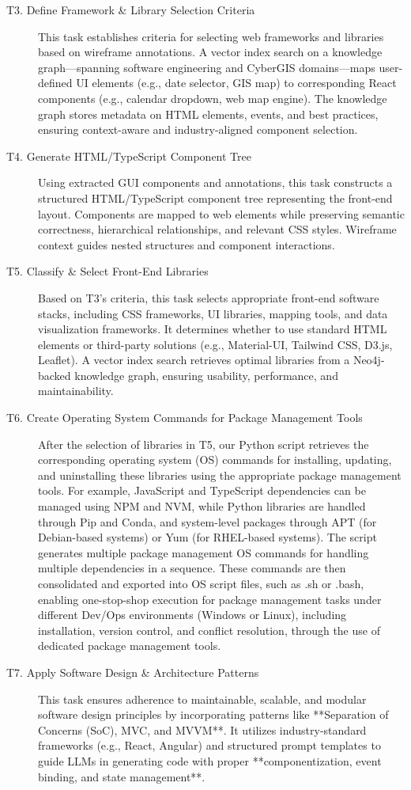 \begin{description}
\begin{description}
    \item[T3. Define Framework \& Library Selection Criteria]  
    This task establishes criteria for selecting web frameworks and libraries based on wireframe annotations. A vector index search on a knowledge graph—spanning software engineering and CyberGIS domains—maps user-defined UI elements (e.g., date selector, GIS map) to corresponding React components (e.g., calendar dropdown, web map engine). The knowledge graph stores metadata on HTML elements, events, and best practices, ensuring context-aware and industry-aligned component selection.

    \item[T4. Generate HTML/TypeScript Component Tree]  
    Using extracted GUI components and annotations, this task constructs a structured HTML/TypeScript component tree representing the front-end layout. Components are mapped to web elements while preserving semantic correctness, hierarchical relationships, and relevant CSS styles. Wireframe context guides nested structures and component interactions.

    \item[T5. Classify \& Select Front-End Libraries]  
    Based on T3's criteria, this task selects appropriate front-end software stacks, including CSS frameworks, UI libraries, mapping tools, and data visualization frameworks. It determines whether to use standard HTML elements or third-party solutions (e.g., Material-UI, Tailwind CSS, D3.js, Leaflet). A vector index search retrieves optimal libraries from a Neo4j-backed knowledge graph, ensuring usability, performance, and maintainability.

    \item[T6. Create Operating System Commands for Package Management Tools] After the selection of libraries in T5, our Python script retrieves the corresponding operating system (OS) commands for installing, updating, and uninstalling these libraries using the appropriate package management tools. For example, JavaScript and TypeScript dependencies can be managed using NPM and NVM, while Python libraries are handled through Pip and Conda, and system-level packages through APT (for Debian-based systems) or Yum (for RHEL-based systems). The script generates multiple package management OS commands for handling multiple dependencies in a sequence. These commands are then consolidated and exported into OS script files, such as .sh or .bash, enabling one-stop-shop execution for package management tasks under different Dev/Ops environments (Windows or Linux), including installation, version control, and conflict resolution, through the use of dedicated package management tools.
    \item[T7. Apply Software Design \& Architecture Patterns]  
    This task ensures adherence to maintainable, scalable, and modular software design principles by incorporating patterns like **Separation of Concerns (SoC), MVC, and MVVM**. It utilizes industry-standard frameworks (e.g., React, Angular) and structured prompt templates to guide LLMs in generating code with proper **componentization, event binding, and state management**.


\end{description}
\end{description}
